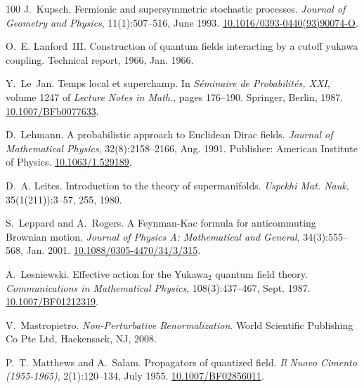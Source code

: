 \documentclass[11pt]{article}
\newcommand{\tmrsub}[1]{\ensuremath{_{\textrm{#1}}}}
\newcommand{\tmtextit}[1]{{\itshape{#1}}}
\begin{document}
\begin{thebibliography}{100}
  J.~Kupsch. {\newblock}Fermionic and
  supersymmetric stochastic processes. {\newblock}\tmtextit{Journal of
  Geometry and Physics}, 11(1):507--516, June 1993. {\newblock}
  \href{https://doi.org/10.1016/0393-0440(93)90074-O}{10.1016/0393-0440(93)90074-O}.
  
  O.~E. Lanford~III.
  {\newblock}Construction of quantum fields interacting by a cutoff yukawa
  coupling. {\newblock}Technical report, 1966, Jan. 1966.
  
  Y.~Le~Jan. {\newblock}Temps local et
  superchamp. {\newblock}In \tmtextit{S{\'e}minaire de Probabilit{\'e}s, XXI},
  volume 1247 of \tmtextit{Lecture Notes in Math.}, pages 176--190. Springer,
  Berlin, 1987.
  {\newblock}\href{https://doi.org/10.1007/BFb0077633}{10.1007/BFb0077633}.
  
  D.~Lehmann. {\newblock}A
  probabilistic approach to Euclidean Dirac fields.
  {\newblock}\tmtextit{Journal of Mathematical Physics}, 32(8):2158--2166,
  Aug. 1991. {\newblock}Publisher: American Institute of Physics.
  \href{https://doi.org/10.1063/1.529189}{10.1063/1.529189}.
  
  D.~A. Leites. {\newblock}Introduction to the theory of
  supermanifolds. {\newblock}\tmtextit{Uspekhi Mat. Nauk}, 35(1(211)):3--57,
  255, 1980.
  
  S.~Leppard and A.~Rogers.
  {\newblock}A Feynman-Kac formula for anticommuting Brownian motion.
  {\newblock}\tmtextit{Journal of Physics A: Mathematical and General},
  34(3):555--568, Jan. 2001. {\newblock}
  \href{https://doi.org/10.1088/0305-4470/34/3/315}{10.1088/0305-4470/34/3/315}.
  
  A.~Lesniewski. {\newblock}Effective
  action for the Yukawa\tmrsub{$2$} quantum field theory.
  {\newblock}\tmtextit{Communications in Mathematical Physics},
  108(3):437--467, Sept. 1987.
  {\newblock}\href{https://doi.org/10.1007/BF01212319}{10.1007/BF01212319}.
  
  V.~Mastropietro.
  {\newblock}\tmtextit{Non-Perturbative Renormalization}. {\newblock}World
  Scientific Publishing Co Pte Ltd, Hackensack, NJ, 2008.
  
  P.~T. Matthews and A.~Salam.
  {\newblock}Propagators of quantized field. {\newblock}\tmtextit{Il Nuovo
  Cimento (1955-1965)}, 2(1):120--134, July 1955.
  {\newblock}\href{https://doi.org/10.1007/BF02856011}{10.1007/BF02856011}.
  

\end{thebibliography}
\end{document}
